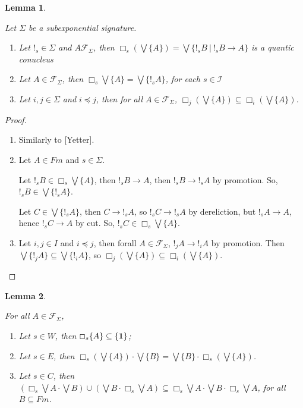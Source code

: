 \documentclass[a4paper]{article}
\theoremstyle{defin}
\theoremstyle{theorem}
\theoremstyle{prop}
\theoremstyle{lemma}
\newtheorem{lemma}{Lemma}
\theoremstyle{ex}
\theoremstyle{col}
\begin{document}
\begin{lemma}
  $ $

Let $\Sigma$ be a subexponential signature.

\begin{enumerate}
\item Let $!_s \in \Sigma$ and $A \mathcal{F}_{\Sigma}$, then $\Box_s (\bigvee \{ A \}) = \bigvee \{ !_s B \: | \: !_s B \rightarrow A \}$ is a quantic conucleus
\item Let $A \in \mathcal{F}_{\Sigma}$, then $\Box_s \bigvee \{ A \} = \bigvee \{ !_s A \}$, for each $s \in \mathcal{I}$
\item  Let $i, j \in \Sigma$ and $i \preceq j$, then for all $A \in \mathcal{F}_{\Sigma}$, $\Box_j (\bigvee \{ A \}) \subseteq \Box_i (\bigvee \{ A \})$.
\end{enumerate}

\end{lemma}

\begin{proof}
$ $

\begin{enumerate}
\item Similarly to [Yetter].
\item Let $A \in Fm$ and $s \in \Sigma$.

Let $!_s B \in \Box_s \bigvee \{ A \}$, then $!_s B \rightarrow A$, then $!_s B \rightarrow !_s A$
by promotion. So, $!_s B \in \bigvee \{ !_s A \}$.

Let $C \in \bigvee \{ !_s A \}$, then $C \rightarrow !_s A$, so $!_s C \rightarrow !_s A$ by dereliction, but $!_s A \rightarrow A$, hence $!_s C \rightarrow A$ by cut. So, $!_s C \in \Box_s \bigvee \{ A \}$.
\item   Let $i, j \in I$ and $i \preceq j$, then forall $A \in \mathcal{F}_{\Sigma}$, $!_j A \rightarrow !_i A$ by promotion.
  Then $\bigvee \{ !_j A \} \subseteq \bigvee \{ !_i A \}$, so $\Box_j (\bigvee \{ A \}) \subseteq \Box_i (\bigvee \{ A \})$.
\end{enumerate}
\end{proof}


\begin{lemma}
$ $

For all $A \in \mathcal{F}_{\Sigma}$,
  \begin{enumerate}
    \item Let $s \in W$, then $\Box_s \{ A \} \subseteq \{ {\bf 1} \}$;
    \item Let $s \in E$, then $\Box_s (\bigvee \{ A \}) \cdot \bigvee \{ B \} = \bigvee \{ B\} \cdot \Box_s (\bigvee \{ A \})$.
    \item Let $s \in C$, then $(\Box_s \bigvee A \cdot \bigvee B) \cup (\bigvee B \cdot \Box_s \bigvee A) \subseteq \Box_s \bigvee A \cdot \bigvee B \cdot \Box_s \bigvee A$, for all $B \subseteq Fm$.
  \end{enumerate}
\end{lemma}
\end{document}
